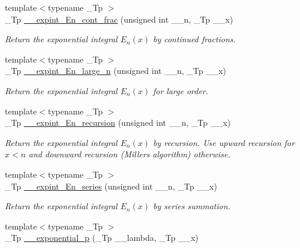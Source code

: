 \begin{DoxyCompactItemize}
{\footnotesize template$<$typename \+\_\+\+Tp $>$ }\\\+\_\+\+Tp \hyperlink{namespacestd_1_1____detail_a34e1eb1248cdad9ceed2aa33732de6ea}{\+\_\+\+\_\+expint\+\_\+\+En\+\_\+cont\+\_\+frac} (unsigned int \+\_\+\+\_\+n, \+\_\+\+Tp \+\_\+\+\_\+x)
\begin{DoxyCompactList}\small\item\em Return the exponential integral $ E_n(x) $ by continued fractions. \end{DoxyCompactList}\item 
{\footnotesize template$<$typename \+\_\+\+Tp $>$ }\\\+\_\+\+Tp \hyperlink{namespacestd_1_1____detail_a77400748c1315de9be10fa5e469df64b}{\+\_\+\+\_\+expint\+\_\+\+En\+\_\+large\+\_\+n} (unsigned int \+\_\+\+\_\+n, \+\_\+\+Tp \+\_\+\+\_\+x)
\begin{DoxyCompactList}\small\item\em Return the exponential integral $ E_n(x) $ for large order. \end{DoxyCompactList}\item 
{\footnotesize template$<$typename \+\_\+\+Tp $>$ }\\\+\_\+\+Tp \hyperlink{namespacestd_1_1____detail_a9b0a2050324390fb6c4a584170289a99}{\+\_\+\+\_\+expint\+\_\+\+En\+\_\+recursion} (unsigned int \+\_\+\+\_\+n, \+\_\+\+Tp \+\_\+\+\_\+x)
\begin{DoxyCompactList}\small\item\em Return the exponential integral $ E_n(x) $ by recursion. Use upward recursion for $ x < n $ and downward recursion (Miller\textquotesingle{}s algorithm) otherwise. \end{DoxyCompactList}\item 
{\footnotesize template$<$typename \+\_\+\+Tp $>$ }\\\+\_\+\+Tp \hyperlink{namespacestd_1_1____detail_a5c51269e411cd82ffec2e63212f76b41}{\+\_\+\+\_\+expint\+\_\+\+En\+\_\+series} (unsigned int \+\_\+\+\_\+n, \+\_\+\+Tp \+\_\+\+\_\+x)
\begin{DoxyCompactList}\small\item\em Return the exponential integral $ E_n(x) $ by series summation. \end{DoxyCompactList}\item 
{\footnotesize template$<$typename \+\_\+\+Tp $>$ }\\\+\_\+\+Tp \hyperlink{namespacestd_1_1____detail_a0b0c47fc902a5df5bce1ce07eef6ec7b}{\+\_\+\+\_\+exponential\+\_\+p} (\+\_\+\+Tp \+\_\+\+\_\+lambda, \+\_\+\+Tp \+\_\+\+\_\+x)

\end{DoxyCompactItemize}
